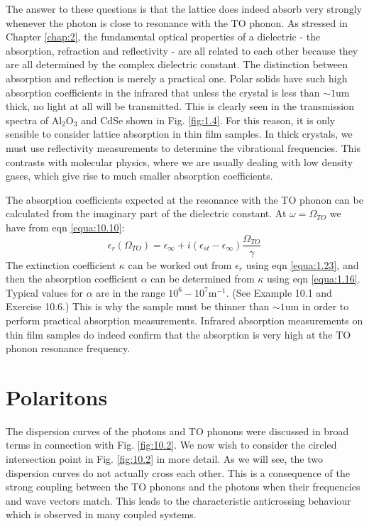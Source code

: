 \documentclass[12pt]{book}
\def\um{\mathrm{um}}
\begin{document}
The answer to these questions is that the lattice does indeed absorb very strongly whenever the photon is close to resonance with the TO phonon. As stressed in Chapter \ref{chap:2}, the fundamental optical properties of a dielectric - the absorption, refraction and reflectivity - are all related to each other because they are all determined by the complex dielectric constant. The distinction between absorption and reflection is merely a practical one. Polar solids have such high absorption coefficients in the infrared that unless the crystal is less than $\sim1\um$ thick, no light at all will be transmitted. This is clearly seen in the transmission spectra of $\mathrm{Al_2O_3}$ and CdSe shown in Fig. \ref{fig:1.4}. For this reason, it is only sensible to consider lattice absorption in thin film samples. In thick crystals, we must use reflectivity measurements to determine the vibrational frequencies. This contrasts with molecular physics, where we are usually dealing with low density gases, which give rise to much smaller absorption coefficients.

The absorption coefficients expected at the resonance with the TO phonon can be calculated from the imaginary part of the dielectric constant. At $\omega=\Omega_{TO}$ we have from eqn \ref{equa:10.10}:
\begin{equation}\label{equa:10.18}
  \epsilon_r(\Omega_{TO})=\epsilon_{\infty}+i(\epsilon_{st}-\epsilon_{\infty})\frac{\Omega_{TO}}{\gamma}
\end{equation}
The extinction coefficient $\kappa$ can be worked out from $\epsilon_r$ using eqn \ref{equa:1.23}, and then the absorption coefficient $\alpha$ can be determined from $\kappa$ using eqn \ref{equa:1.16}. Typical values for $\alpha$ are in the range $10^6-10^7\mathrm{m^{-1}}$. (See Example 10.1 and Exercise 10.6.) This is why the sample must be thinner than $\sim1\um$ in order to perform practical absorption measurements. Infrared absorption measurements on thin film samples do indeed confirm that the absorption is very high at the TO phonon resonance frequency.

\section{Polaritons}
The dispersion curves of the photons and TO phonons were discussed in broad terms in connection with Fig. \ref{fig:10.2}. We now wish to consider the circled intersection point in Fig. \ref{fig:10.2} in more detail. As we will see, the two dispersion curves do not actually cross each other. This is a consequence of the strong coupling between the TO phonons and the photons when their frequencies and wave vectors match. This leads to the characteristic anticrossing behaviour which is observed in many coupled systems.
\end{document}
